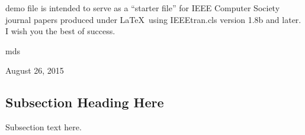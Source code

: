 \begin{comment}
 Computer Society journal (but not conference!) papers do something unusual
 with the very first section heading (almost always called "Introduction").
 They place it ABOVE the main text! IEEEtran.cls does not automatically do
 this for you, but you can achieve this effect with the provided
 \IEEEraisesectionheading{} command. Note the need to keep any \label that
 is to refer to the section immediately after \section in the above as
 \IEEEraisesectionheading puts \section within a raised box.




 The very first letter is a 2 line initial drop letter followed
 by the rest of the first word in caps (small caps for compsoc).
 
 form to use if the first word consists of a single letter:
 \IEEEPARstart{A}{demo} file is ....
 
 form to use if you need the single drop letter followed by
 normal text (unknown if ever used by the IEEE):
 \IEEEPARstart{A}{}demo file is ....
 
 Some journals put the first two words in caps:
 \IEEEPARstart{T}{his demo} file is ....
 
 Here we have the typical use of a "T" for an initial drop letter
 and "HIS" in caps to complete the first word.
\end{comment}
 demo file is intended to serve as a ``starter file''
for IEEE Computer Society journal papers produced under \LaTeX\ using
IEEEtran.cls version 1.8b and later.
I wish you the best of success.

\hfill mds
 
\hfill August 26, 2015

\subsection{Subsection Heading Here}
Subsection text here.

